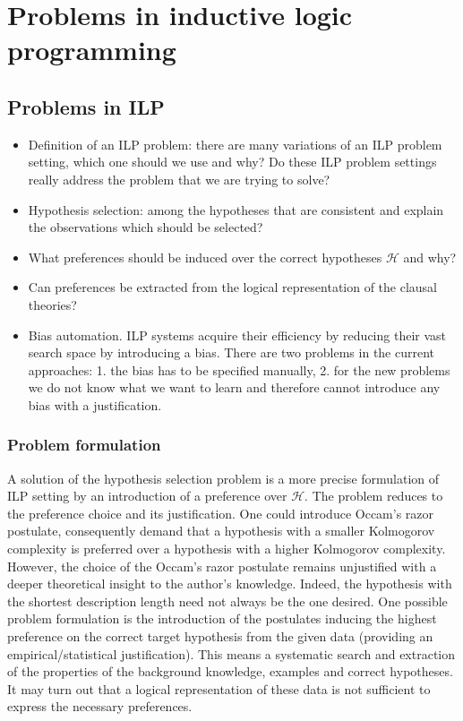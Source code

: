 \chapter{Problems in inductive logic programming}

\section{Problems in ILP}
\begin{itemize}
\item Definition of an ILP problem: there are many variations of an ILP problem setting, which one should we use and why? Do these ILP problem settings really address the problem that we are trying to solve?
\item Hypothesis selection: among the hypotheses that are consistent and explain the observations which should be selected?
\item What preferences should be induced over the correct hypotheses $\mathcal{H}$ and why?
\item Can preferences be extracted from the logical representation of the clausal theories?
\item Bias automation. ILP systems acquire their efficiency by reducing their vast search space by introducing a bias. There are two problems in the current approaches: 1. the bias has to be specified manually, 2. for the new problems we do not know what we want to learn and therefore cannot introduce any bias with a justification.
\end{itemize}
\subsection{Problem formulation}
A solution of the hypothesis selection problem is a more precise formulation of ILP setting by an introduction of a preference over $\mathcal{H}$. The problem reduces to the preference choice and its justification. One could introduce Occam's razor postulate, consequently demand that a hypothesis with a smaller Kolmogorov complexity is preferred over a hypothesis with a higher Kolmogorov complexity. However, the choice of the Occam's razor postulate remains unjustified with a deeper theoretical insight to the author's knowledge. Indeed, the hypothesis with the shortest description length need not always be the one desired. One possible problem formulation is the introduction of the postulates inducing the highest preference on the correct target hypothesis from the given data (providing an empirical/statistical justification). This means a systematic search and extraction of the properties of the background knowledge, examples and correct hypotheses. It may turn out that a logical representation of these data is not sufficient to express the necessary preferences.
